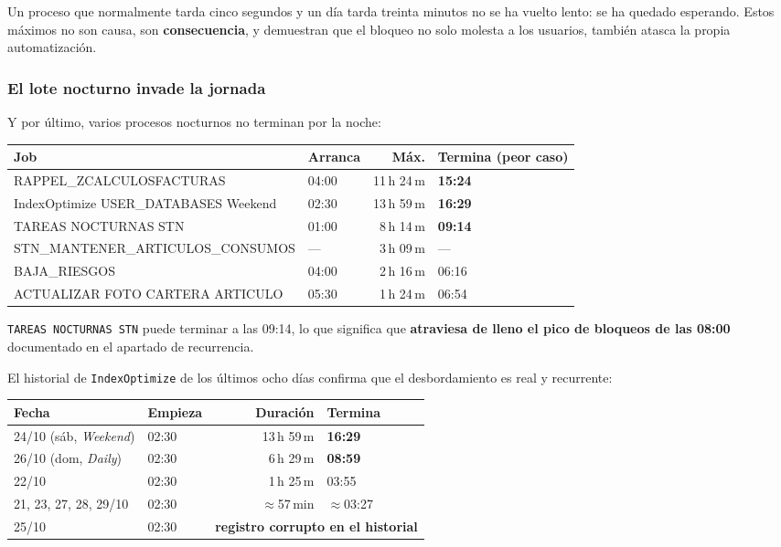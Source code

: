 \documentclass[11pt,a4paper]{article}
\newcommand{\cod}[1]{\texttt{\small #1}}
\newcommand{\critico}[1]{\textcolor{rojo}{\textbf{#1}}}
\newcommand{\aviso}[1]{\textcolor{ambar}{\textbf{#1}}}
\begin{document}
Un proceso que normalmente tarda cinco segundos y un día tarda treinta
minutos no se ha vuelto lento: se ha quedado esperando. Estos máximos no son
causa, son \textbf{consecuencia}, y demuestran que el bloqueo no solo molesta
a los usuarios, también atasca la propia automatización.

\subsubsection*{El lote nocturno invade la jornada}

Y por último, varios procesos nocturnos no terminan por la noche:

\begin{table}[h]
\centering
\small
\begin{tabular}{llrl}
\toprule
\textbf{Job} & \textbf{Arranca} & \textbf{Máx.} & \textbf{Termina (peor caso)} \\
\midrule
RAPPEL\_ZCALCULOSFACTURAS & 04:00 & 11\,h 24\,m & \critico{15:24} \\
IndexOptimize USER\_DATABASES Weekend & 02:30 & 13\,h 59\,m & \critico{16:29} \\
TAREAS NOCTURNAS STN & 01:00 & 8\,h 14\,m & \critico{09:14} \\
STN\_MANTENER\_ARTICULOS\_CONSUMOS & --- & 3\,h 09\,m & --- \\
BAJA\_RIESGOS & 04:00 & 2\,h 16\,m & 06:16 \\
ACTUALIZAR FOTO CARTERA ARTICULO & 05:30 & 1\,h 24\,m & 06:54 \\
\bottomrule
\end{tabular}
\end{table}

\cod{TAREAS NOCTURNAS STN} puede terminar a las 09:14, lo que significa que
\textbf{atraviesa de lleno el pico de bloqueos de las 08:00} documentado en el
apartado de recurrencia.

El historial de \cod{IndexOptimize} de los últimos ocho días confirma que el
desbordamiento es real y recurrente:

\begin{table}[h]
\centering
\small
\begin{tabular}{llrl}
\toprule
\textbf{Fecha} & \textbf{Empieza} & \textbf{Duración} & \textbf{Termina} \\
\midrule
24/10 (sáb, \emph{Weekend}) & 02:30 & 13\,h 59\,m & \critico{16:29} \\
26/10 (dom, \emph{Daily})   & 02:30 &  6\,h 29\,m & \critico{08:59} \\
22/10 & 02:30 & 1\,h 25\,m & 03:55 \\
21, 23, 27, 28, 29/10 & 02:30 & $\approx$57\,min & $\approx$03:27 \\
25/10 & 02:30 & \multicolumn{2}{l}{\aviso{registro corrupto en el historial}} \\
\bottomrule
\end{tabular}
\end{table}
\end{document}
